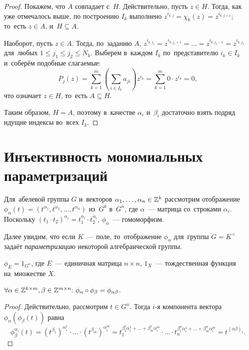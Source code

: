 \documentclass[a4paper,oneside]{article}
\begin{document}
\begin{proof}
  Покажем, что $A$ совпадает с~$H$. Действительно, пусть $z \in H$. Тогда, как уже отмечалось выше,
  по построению $I_k$ выполнено $z^{i_{k, j}} = \chi_k(z) = z^{i_{k, j + 1}}$; то~есть $z \in A$, и~$H \subseteq A$.

  Наоборот, пусть $z \in A$. Тогда, по~заданию $A$, $z^{i_{k, j_1}} = z^{i_{k, j_1 + 1}} = \ldots = z^{i_{k, j_2 - 1}} = z^{i_{k, j_2}}$
  для~любых $1 \leq j_1 \leq j_2 \leq N_k$. Выберем в~каждом $I_k$ по~представителю $i_k \in I_k$ и~соберём подобные слагаемые:
  $$
      P_j(z) = \sum_{k = 1}^{m} \left( \sum_{i \in I_k} a_{ji} \right) z^{i_k} = \sum_{k = 1}^{m} 0 \cdot z^{i_k} = 0,
  $$
  что означает $z \in H$, то~есть $A \subseteq H$.

  Таким образом, $H = A$, поэтому в~качестве $\alpha_i$ и~$\beta_i$ достаточно взять подряд идущие индексы во~всех $I_k$.
\end{proof}

\section{Инъективность мономиальных параметризаций}

Для~абелевой группы $G$ и~векторов $\alpha_1, \ldots, \alpha_n \in \mathbb{Z}^k$ рассмотрим отображение $\phi_\alpha(t) = (t^{\alpha_1}, t^{\alpha_2}, \ldots, t^{\alpha_n})$
из~$G^k$ в~$G^n$, где $\alpha$~— матрица со~строками $\alpha_i$. Поскольку $(t_1 \cdot t_2)^{\alpha_i} = t_1^{\alpha_i} \cdot t_2^{\alpha_i}$,
$\phi_\alpha$~— гомоморфизм.

Далее увидим, что если $K$~— поле, то~отображение $\phi_\alpha$ для~группы $G = K^\times$ задаёт \textit{параметризацию} некоторой алгебраической группы.

\begin{statement*}
    $\phi_{E} = 1_{G^n}$, где $E$~— единичная матрица $n \times n$, $1_X$~— тождественная функция на~множестве $X$.
\end{statement*}

\begin{statement*}
    $
        \forall \alpha \in \mathbb{Z}^{k \times m}, \beta \in \mathbb{Z}^{m \times n}{:}\ \phi_\alpha \circ \phi_\beta = \phi_{\alpha \beta}
    $.
\end{statement*}

\begin{proof}
    Действительно, рассмотрим $t \in G^n$. Тогда $i$-я компонента вектора $\phi_\alpha(\phi_\beta(t))$
    равна
    $$ \phi_\beta^{\alpha_i}(t) = (t^{\beta_1})^{\alpha_i^1} \cdot \ldots \cdot (t^{\beta_m})^{\alpha_i^m}
                                = t_1^{\beta_1^1 \alpha_i^1 + \ldots + \beta_m^1 \alpha_i^m} \cdot
                                  \ldots \cdot
                                  t_n^{\beta_1^n \alpha_i^1 + \ldots + \beta_m^n \alpha_i^m}
                                = t^{(\alpha \beta)_i}.
    $$
\end{proof}
\end{document}
